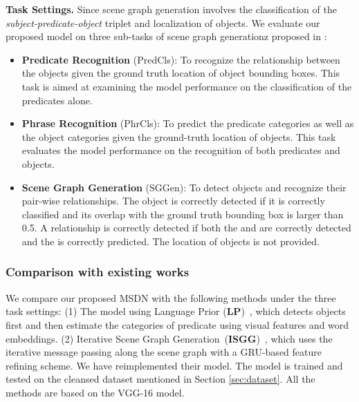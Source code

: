 \textbf{Task Settings.} Since scene graph generation involves the classification of the \emph{subject-predicate-object}  triplet and localization of objects. We evaluate our proposed model on three sub-tasks of scene graph generationz proposed in \cite{xu2017scene}:
\begin{itemize}
	\item \textbf{Predicate Recognition} (PredCls): To recognize the relationship between the objects given the ground truth location of object bounding boxes. This task is aimed at examining the model performance on the classification of the predicates alone.

	\item \textbf{Phrase Recognition} (PhrCls): To predict the predicate categories as well as the object categories given the ground-truth location of objects. This task evaluates the model performance on the recognition of both predicates and objects.

	\item \textbf{Scene Graph Generation} (SGGen): To detect objects and recognize their pair-wise relationships. The object is correctly detected if it is correctly classified and its overlap with the ground truth bounding box is larger than 0.5. A relationship is correctly detected if both the  and  are correctly detected and the  is correctly predicted. The location of objects is not provided.
\end{itemize} 




\subsubsection{Comparison with existing works}

We compare our proposed MSDN with the following methods under the three task settings:  (1) The model using Language Prior (\textbf{LP})~\cite{visual_relationship}, which detects objects first and then estimate the categories of predicate using visual features and word embeddings. (2) Iterative Scene Graph Generation~(\textbf{ISGG})~\cite{xu2017scene}, which uses the iterative message passing along the scene graph with a GRU-based feature refining scheme. We have reimplemented their model. The model is trained and tested on the cleansed dataset mentioned in Section \ref{sec:dataset}.  All the methods are based on the VGG-16 model.

